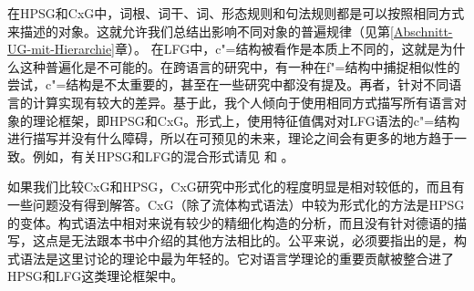 在HPSG和CxG中，词根、词干、词、形态规则和句法规则都是可以按照相同方式来描述的对象。这就允许我们总结出影响不同对象的普遍规律（见第\ref{Abschnitt-UG-mit-Hierarchie}章）。
在LFG中，c"=结构被看作是本质上不同的，这就是为什么这种普遍化是不可能的。在跨语言的研究中，有一种在f"=结构中捕捉相似性的尝试，c"=结构是不太重要的，甚至在一些研究中都没有提及。再者，针对不同语言的计算实现有较大的差异。基于此，我个人倾向于使用相同方式描写所有语言对象的理论框架，即HPSG和CxG。形式上，使用特征值偶对对LFG语法的c"=结构进行描写并没有什么障碍，所以在可预见的未来，理论之间会有更多的地方趋于一致。例如，有关HPSG和LFG的混合形式请见 和 。

如果我们比较CxG和HPSG，CxG研究中形式化的程度明显是相对较低的，而且有一些问题没有得到解答。CxG（除了流体构式语法）中较为形式化的方法是HPSG的变体。构式语法中相对来说有较少的精细化构造的分析，而且没有针对德语的描写，这点是无法跟本书中介绍的其他方法相比的。公平来说，必须要指出的是，构式语法是这里讨论的理论中最为年轻的。它对语言学理论的重要贡献被整合进了HPSG和LFG这类理论框架中。

